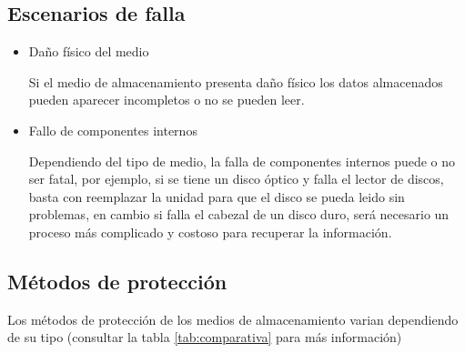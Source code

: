   \subsection {Escenarios de falla}

    \begin{itemize}

      \item Da\~{n}o f\'{i}sico del medio

Si el medio de almacenamiento presenta da\~{n}o f\'{i}sico los datos almacenados pueden aparecer incompletos o no se pueden leer.


      \item Fallo de componentes internos

Dependiendo del tipo de medio, la falla de componentes internos puede o no ser fatal, por ejemplo, si se tiene un disco \'{o}ptico y falla el lector de discos, basta con reemplazar la unidad para que el disco se pueda leido sin problemas, en cambio si falla el cabezal de un disco duro, ser\'{a} necesario un proceso m\'{a}s complicado y costoso para recuperar la informaci\'{o}n.


    \end{itemize}

  \subsection {M\'{e}todos de protecci\'{o}n}

Los m\'{e}todos de protecci\'{o}n de los medios de almacenamiento varian dependiendo de su tipo (consultar la tabla \ref{tab:comparativa} para m\'{a}s informaci\'{o}n)

